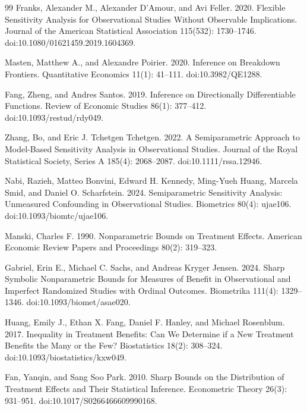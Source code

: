 \documentclass{article}
\begin{document}
\begin{thebibliography}{99}
   Franks, Alexander M., Alexander D'Amour, and Avi Feller. 2020. Flexible Sensitivity Analysis for Observational Studies Without Observable Implications. Journal of the American Statistical Association 115(532): 1730--1746. doi:10.1080/01621459.2019.1604369.

   Masten, Matthew A., and Alexandre Poirier. 2020. Inference on Breakdown Frontiers. Quantitative Economics 11(1): 41--111. doi:10.3982/QE1288.

   Fang, Zheng, and Andres Santos. 2019. Inference on Directionally Differentiable Functions. Review of Economic Studies 86(1): 377--412. doi:10.1093/restud/rdy049.

   Zhang, Bo, and Eric J. Tchetgen Tchetgen. 2022. A Semiparametric Approach to Model-Based Sensitivity Analysis in Observational Studies. Journal of the Royal Statistical Society, Series A 185(4): 2068--2087. doi:10.1111/rssa.12946.

   Nabi, Razieh, Matteo Bonvini, Edward H. Kennedy, Ming-Yueh Huang, Marcela Smid, and Daniel O. Scharfstein. 2024. Semiparametric Sensitivity Analysis: Unmeasured Confounding in Observational Studies. Biometrics 80(4): ujae106. doi:10.1093/biomtc/ujae106.

   Manski, Charles F. 1990. Nonparametric Bounds on Treatment Effects. American Economic Review Papers and Proceedings 80(2): 319--323.

   Gabriel, Erin E., Michael C. Sachs, and Andreas Kryger Jensen. 2024. Sharp Symbolic Nonparametric Bounds for Measures of Benefit in Observational and Imperfect Randomized Studies with Ordinal Outcomes. Biometrika 111(4): 1329--1346. doi:10.1093/biomet/asae020.

   Huang, Emily J., Ethan X. Fang, Daniel F. Hanley, and Michael Rosenblum. 2017. Inequality in Treatment Benefits: Can We Determine if a New Treatment Benefits the Many or the Few? Biostatistics 18(2): 308--324. doi:10.1093/biostatistics/kxw049.

   Fan, Yanqin, and Sang Soo Park. 2010. Sharp Bounds on the Distribution of Treatment Effects and Their Statistical Inference. Econometric Theory 26(3): 931--951. doi:10.1017/S0266466609990168.

\end{thebibliography}
\end{document}

